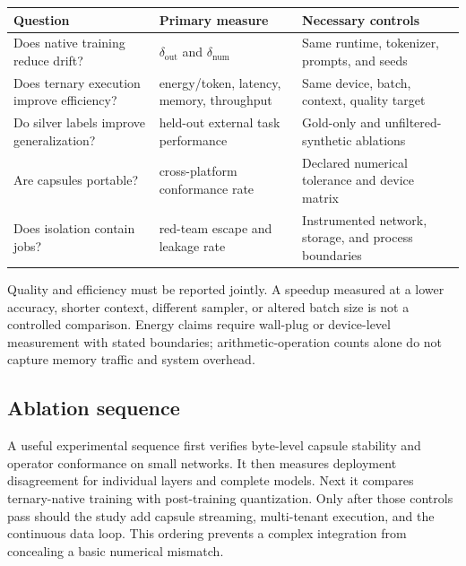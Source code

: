 \documentclass[11pt]{article}
\begin{document}
\begin{longtable}{L{3.2cm}L{4.3cm}L{5cm}}
\toprule
\textbf{Question} & \textbf{Primary measure} & \textbf{Necessary controls} \\
\midrule
\endhead
Does native training reduce drift? & $\delta_{\text{out}}$ and $\delta_{\text{num}}$ & Same runtime, tokenizer, prompts, and seeds \\
Does ternary execution improve efficiency? & energy/token, latency, memory, throughput & Same device, batch, context, quality target \\
Do silver labels improve generalization? & held-out external task performance & Gold-only and unfiltered-synthetic ablations \\
Are capsules portable? & cross-platform conformance rate & Declared numerical tolerance and device matrix \\
Does isolation contain jobs? & red-team escape and leakage rate & Instrumented network, storage, and process boundaries \\
\bottomrule
\end{longtable}

Quality and efficiency must be reported jointly. A speedup measured at a lower accuracy, shorter context, different sampler, or altered batch size is not a controlled comparison. Energy claims require wall-plug or device-level measurement with stated boundaries; arithmetic-operation counts alone do not capture memory traffic and system overhead.

\subsection{Ablation sequence}
A useful experimental sequence first verifies byte-level capsule stability and operator conformance on small networks. It then measures deployment disagreement for individual layers and complete models. Next it compares ternary-native training with post-training quantization. Only after those controls pass should the study add capsule streaming, multi-tenant execution, and the continuous data loop. This ordering prevents a complex integration from concealing a basic numerical mismatch.
\end{document}

